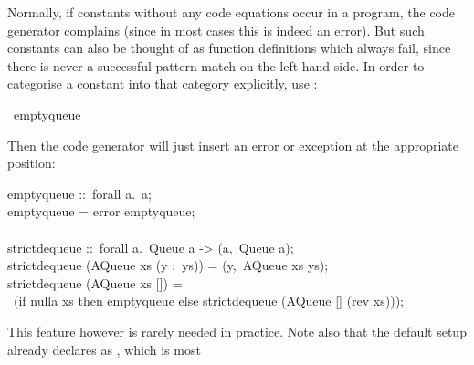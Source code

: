\begin{isabellebody}
\begin{isamarkuptext}
  Normally, if constants without any code equations occur in a
  program, the code generator complains (since in most cases this is
  indeed an error).  But such constants can also be thought
  of as function definitions which always fail,
  since there is never a successful pattern match on the left hand
  side.  In order to categorise a constant into that category
  explicitly, use \hyperlink{command.code-abort}{\mbox{}}:%
\end{isamarkuptext}%
\isamarkuptrue%
%
\isadelimquote
%
\endisadelimquote
%
\isatagquote
{}\isamarkupfalse%
\ empty{\isacharunderscore}queue%
\endisatagquote
{\isafoldquote}%
%
\isadelimquote
%
\endisadelimquote
%
\begin{isamarkuptext}%
\noindent Then the code generator will just insert an error or
  exception at the appropriate position:%
\end{isamarkuptext}%
\isamarkuptrue%
%
\isadelimquote
%
\endisadelimquote
%
\isatagquote
%
\begin{isamarkuptext}%
\isatypewriter%
\noindent%
\hspace*{0pt}empty{}queue ::~forall a.~a;\\
\hspace*{0pt}empty{}queue = error {}empty{}queue{};\\
\hspace*{0pt}\\
\hspace*{0pt}strict{}dequeue ::~forall a.~Queue a -> (a,~Queue a);\\
\hspace*{0pt}strict{}dequeue (AQueue xs (y :~ys)) = (y,~AQueue xs ys);\\
\hspace*{0pt}strict{}dequeue (AQueue xs []) =\\
\hspace*{0pt} ~(if nulla xs then empty{}queue else strict{}dequeue (AQueue [] (rev xs)));%
\end{isamarkuptext}%
\isamarkuptrue%
%
\endisatagquote
{\isafoldquote}%
%
\isadelimquote
%
\endisadelimquote
%
\begin{isamarkuptext}%
\noindent This feature however is rarely needed in practice.
  Note also that the  default setup already declares
   as \hyperlink{command.code-abort}{\mbox{}}, which is most

\end{isamarkuptext}
\end{isabellebody}
